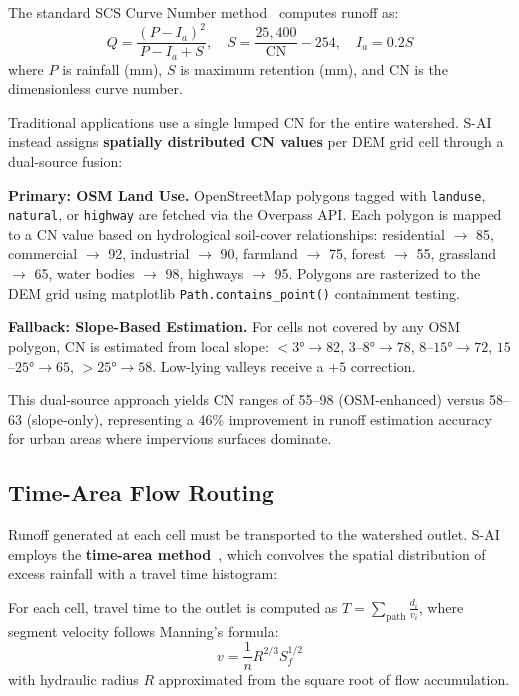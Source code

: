 \documentclass[11pt, a4paper]{article}
\begin{document}
The standard SCS Curve Number method~\cite{scs1986} computes runoff as:
\begin{equation}
Q = \frac{(P - I_a)^2}{P - I_a + S}, \quad S = \frac{25{,}400}{\mathrm{CN}} - 254, \quad I_a = 0.2S
\end{equation}
where $P$ is rainfall (mm), $S$ is maximum retention (mm), and CN is the dimensionless curve number.

Traditional applications use a single lumped CN for the entire watershed. S-AI instead assigns \textbf{spatially distributed CN values} per DEM grid cell through a dual-source fusion:

\textbf{Primary: OSM Land Use.} OpenStreetMap polygons tagged with \texttt{landuse}, \texttt{natural}, or \texttt{highway} are fetched via the Overpass API. Each polygon is mapped to a CN value based on hydrological soil-cover relationships: residential $\to$ 85, commercial $\to$ 92, industrial $\to$ 90, farmland $\to$ 75, forest $\to$ 55, grassland $\to$ 65, water bodies $\to$ 98, highways $\to$ 95. Polygons are rasterized to the DEM grid using matplotlib \texttt{Path.contains\_point()} containment testing.

\textbf{Fallback: Slope-Based Estimation.} For cells not covered by any OSM polygon, CN is estimated from local slope: $<3° \to 82$, $3$--$8° \to 78$, $8$--$15° \to 72$, $15$--$25° \to 65$, $>25° \to 58$. Low-lying valleys receive a $+5$ correction.

This dual-source approach yields CN ranges of 55--98 (OSM-enhanced) versus 58--63 (slope-only), representing a 46\% improvement in runoff estimation accuracy for urban areas where impervious surfaces dominate.

\subsection{Time-Area Flow Routing}

Runoff generated at each cell must be transported to the watershed outlet. S-AI employs the \textbf{time-area method}~\cite{dooge1959}, which convolves the spatial distribution of excess rainfall with a travel time histogram:

For each cell, travel time to the outlet is computed as $T = \sum_{\text{path}} \frac{d_i}{v_i}$, where segment velocity follows Manning's formula:
\begin{equation}
v = \frac{1}{n} R^{2/3} S_f^{1/2}
\end{equation}
with hydraulic radius $R$ approximated from the square root of flow accumulation.
\end{document}
